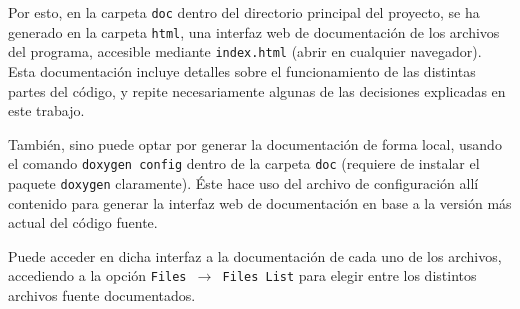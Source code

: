 \documentclass[a4paper]{article}
\begin{document}
Por esto, en la carpeta \texttt{doc} dentro del directorio principal del proyecto, se ha generado en la carpeta \texttt{html}, una interfaz web de documentación de los archivos del programa, accesible mediante \texttt{index.html} (abrir en cualquier navegador). Esta documentación incluye detalles sobre el funcionamiento de las distintas partes del código, y repite necesariamente algunas de las decisiones explicadas en este trabajo.

También, sino puede optar por generar la documentación de forma local, usando el comando \texttt{doxygen config} dentro de la carpeta \texttt{doc} (requiere de instalar el paquete \texttt{doxygen} claramente). Éste hace uso del archivo de configuración allí contenido para generar la interfaz web de documentación en base a la versión más actual del código fuente.

Puede acceder en dicha interfaz a la documentación de cada uno de los archivos, accediendo a la opción \texttt{Files $\rightarrow$ Files List} para elegir entre los distintos archivos fuente documentados.

{}

\end{document}
